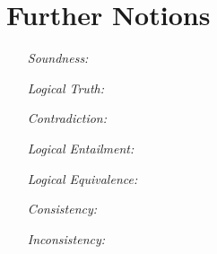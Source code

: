 \documentclass[a4paper, 11pt]{article} %
\begin{document}
\section*{Further Notions}

\begin{enumerate}[leftmargin=1.2in,labelsep=.15in] %
  \item[\it Soundness:] 
  \item[\it Logical Truth:]
  \item[\it Contradiction:]
  \item[\it Logical Entailment:]
  \item[\it Logical Equivalence:]
  \item[\it Consistency:]
  \item[\it Inconsistency:]
\end{enumerate}



%
\end{document}
